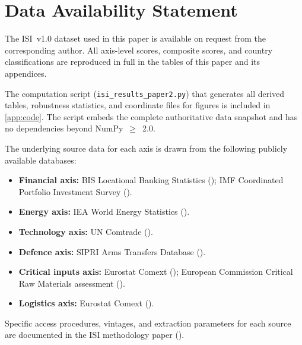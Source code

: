 \section{Data Availability Statement}\label{sec:data-availability}

The ISI~v1.0 dataset used in this paper is available on request from
the corresponding author.  All axis-level scores, composite scores,
and country classifications are reproduced in full in the tables of
this paper and its appendices.

The computation script (\texttt{isi\_results\_paper2.py}) that
generates all derived tables, robustness statistics, and coordinate
files for figures is included in \cref{app:code}.  The script embeds
the complete authoritative data snapshot and has no dependencies
beyond NumPy~$\geq$~2.0.

The underlying source data for each axis is drawn from the following
publicly available databases:

\begin{itemize}[leftmargin=2em]
  \item \textbf{Financial axis:} BIS Locational Banking Statistics
    (\cite{bis_lbs}); IMF Coordinated Portfolio Investment Survey
    (\cite{imf_cpis}).
  \item \textbf{Energy axis:} IEA World Energy Statistics
    (\cite{iea_wes}).
  \item \textbf{Technology axis:} UN Comtrade (\cite{uncomtrade}).
  \item \textbf{Defence axis:} SIPRI Arms Transfers Database
    (\cite{sipri_transfers}).
  \item \textbf{Critical inputs axis:} Eurostat Comext
    (\cite{eurostat_comext}); European Commission Critical Raw
    Materials assessment (\cite{ec_critical_raw}).
  \item \textbf{Logistics axis:} Eurostat Comext
    (\cite{eurostat_comext}).
\end{itemize}

\noindent Specific access procedures, vintages, and extraction
parameters for each source are documented in the ISI methodology
paper (\cite{isi_paper1}).
